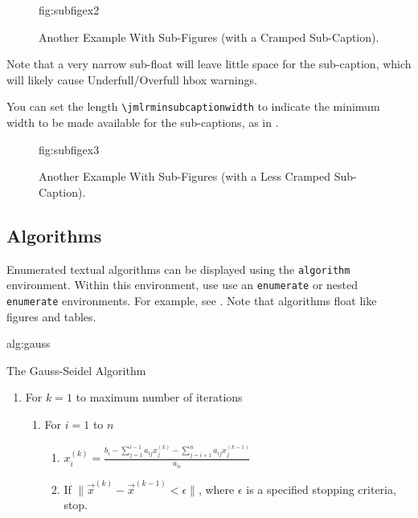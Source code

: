 \documentclass[pmlr]{jmlr}%
\begin{document}
\begin{figure}[htbp]
\floatconts
  {fig:subfigex2}
  {\caption{Another Example With Sub-Figures (with a Cramped
    Sub-Caption).}}
  {%
    \qquad
  }%
\end{figure}

Note that a very narrow sub-float will leave little space for the
sub-caption, which will likely cause Underfull/Overfull hbox warnings.

You can set the length \verb|\jmlrminsubcaptionwidth| to indicate
the minimum width to be made available for the sub-captions, as in
.

\begin{figure}[htbp]
\floatconts
  {fig:subfigex3}
  {\caption{Another Example With Sub-Figures (with a Less Cramped
    Sub-Caption).}}
  {\setlength{\jmlrminsubcaptionwidth}{0.2\linewidth}%
    \qquad
  }%
\end{figure}


\subsection{Algorithms}
\label{sec:algorithms}

Enumerated textual algorithms can be displayed using the
\texttt{algorithm} environment. Within this environment, use
use an \texttt{enumerate} or nested \texttt{enumerate} environments.
For example, see . Note that algorithms
float like figures and tables.

\begin{algorithm}[htbp]
\floatconts
{alg:gauss}%
{\caption{The Gauss-Seidel Algorithm}}
{%
\begin{enumerate}
  \item For $k=1$ to maximum number of iterations
    \begin{enumerate}
      \item For $i=1$ to $n$
        \begin{enumerate}
        \item $x_i^{(k)} = 
          \frac{b_i - \sum_{j=1}^{i-1}a_{ij}x_j^{(k)}
          - \sum_{j=i+1}^{n}a_{ij}x_j^{(k-1)}}{a_{ii}}$
        \item If $\|\vec{x}^{(k)}-\vec{x}^{(k-1)} < \epsilon\|$,
          where $\epsilon$ is a specified stopping criteria, stop.
      \end{enumerate}
    \end{enumerate}
\end{enumerate}
}
\end{algorithm}
\end{document}
